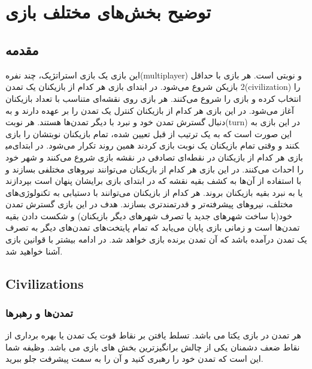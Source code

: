 \documentclass[]{article}
\begin{document}
\KashidaOff
\newpage

 \Large \textbf{\\\\}


\section*{{\titr توضیح بخش‌های مختلف بازی}}

\subsection*{{\titr مقدمه}}
این بازی یک بازی استراتژیک، چند نفره(multiplayer) و نوبتی است. هر بازی با حداقل 2 بازیکن شروع می‌شود. در ابتدای بازی هر کدام از بازیکنان یک تمدن(civilization) را انتخاب کرده و بازی را شروع می‌کنند. هر بازی روی نقشه‌ای متناسب با تعداد بازیکنان آغاز می‌شود. در این بازی هر کدام از بازیکنان کنترل یک تمدن را بر عهده دارند و به دنبال گسترش تمدن خود و نبرد با دیگر تمدن‌ها هستند. هر نوبت(turn) در این بازی به این صورت است که به یک ترتیب از قبل تعیین شده، تمام بازیکنان نوبتشان را بازی می‎کنند و وقتی تمام بازیکنان یک نوبت بازی کردند همین روند تکرار می‌شود. در ابتدای بازی هر کدام از بازیکنان در نقطه‌ای تصادفی در نقشه بازی شروع می‌کنند و شهر خود را احداث می‌کنند. در این بازی هر کدام از بازیکنان می‌توانند نیروهای مختلفی بسازند و با استفاده از آن‌ها به کشف بقیه نقشه که در ابتدای بازی برایشان پنهان است بپردازند یا به نبرد بقیه بازیکنان بروند. هر کدام از بازیکنان می‌توانند با دستیابی به تکنولوژی‌های مختلف، نیروهای پیشرفته‌تر و قدرتمند‌تری بسازند. هدف در این بازی گسترش تمدن خود(با ساخت شهر‌های جدید یا تصرف شهر‌های دیگر بازیکنان) و شکست دادن بقیه تمدن‌ها است و زمانی بازی پایان می‌یابد که تمام پایتخت‌های تمدن‌های دیگر به تصرف یک تمدن درآمده باشد که آن تمدن برنده بازی خواهد شد. در ادامه بیشتر با قوانین بازی آشنا خواهید شد.

\subsection*{{\titr Civilizations}}

\subsubsection*{{\titr تمدن‌ها و رهبرها}}
هر تمدن در بازی یکتا می باشد. تسلط یافتن بر نقاط قوت یک تمدن یا بهره برداری از نقاط ضعف دشمنان یکی از چالش برانگیزترین بخش های بازی می باشد. وظیفه شما این است که تمدن خود را رهبری کنید و آن را به سمت پیشرفت جلو ببرید.
\end{document}
